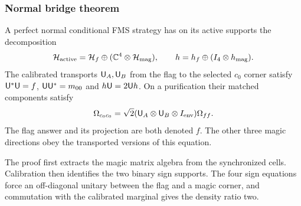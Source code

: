\subsubsection{Normal bridge theorem}
\begin{lemma}\label{lem:bridge}
A perfect normal conditional FMS strategy has on its active supports the decomposition
\[
 \mathcal H_{\rm active}=\mathcal H_f\oplus(\mathbb C^4\otimes\mathcal H_{\rm mag}),
 \qquad h=h_f\oplus(I_4\otimes h_{\rm mag}).
\]
The calibrated transports ${\mathsf U}_A,{\mathsf U}_B$ from the flag to the selected $c_0$ corner satisfy ${\mathsf U}^*{\mathsf U}=f$, ${\mathsf U}{\mathsf U}^*=m_{00}$ and $h{\mathsf U}=2{\mathsf U}h$. On a purification their matched components satisfy
\begin{equation}\label{eq:bridgevector}
 \Omega_{c_0c_0}=\sqrt2({\mathsf U}_A\otimes {\mathsf U}_B\otimes I_{\rm env})\Omega_{ff}.
\end{equation}
The flag answer and its projection are both denoted $f$. The other three magic directions obey the transported versions of this equation.
\end{lemma}
The proof first extracts the magic matrix algebra from the synchronized cells. Calibration then identifies the two binary sign supports. The four sign equations force an off-diagonal unitary between the flag and a magic corner, and commutation with the calibrated marginal gives the density ratio two.

